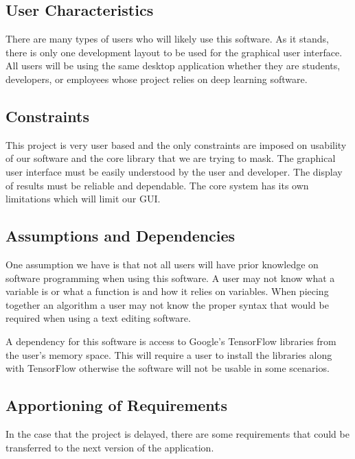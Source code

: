 \documentclass[journal,10pt,onecolumn,compsoc]{IEEEtran} \usepackage[margin=1.0in]{geometry} \usepackage{pdfpages} \usepackage{graphicx}
\begin{document}
\subsection{User Characteristics}

There are many types of users who will likely use this software. 
As it stands, there is only one development layout to be used for the graphical user interface.
All users will be using the same desktop application whether they are students, developers, or employees whose project relies on deep learning software.

\subsection{Constraints}

This project is very user based and the only constraints are imposed on usability of our software and the core library that we are trying to mask.
The graphical user interface must be easily understood by the user and developer.
The display of results must be reliable and dependable.
The core system has its own limitations which will limit our GUI.

\subsection{Assumptions and Dependencies}

One assumption we have is that not all users will have prior knowledge on software programming when using this software.
A user may not know what a variable is or what a function is and how it relies on variables. 
When piecing together an algorithm a user may not know the proper syntax that would be required when using a text editing software.

A dependency for this software is access to Google's TensorFlow libraries from the user's memory space. 
This will require a user to install the libraries along with TensorFlow otherwise the software will not be usable in some scenarios.

\subsection{Apportioning of Requirements}

In the case that the project is delayed, there are some requirements that could be transferred to the next version of the application. 
\end{document}
